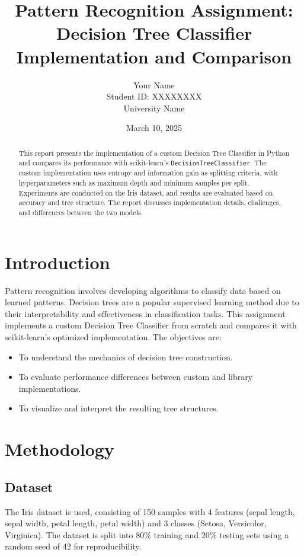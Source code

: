 \documentclass[a4paper,12pt]{article}
\title{Pattern Recognition Assignment: Decision Tree Classifier Implementation and Comparison}
\author{Your Name \\ Student ID: XXXXXXXX \\ University Name}
\date{March 10, 2025}
\begin{document}
\maketitle

\begin{abstract}
This report presents the implementation of a custom Decision Tree Classifier in Python and compares its performance with scikit-learn's \texttt{DecisionTreeClassifier}. The custom implementation uses entropy and information gain as splitting criteria, with hyperparameters such as maximum depth and minimum samples per split. Experiments are conducted on the Iris dataset, and results are evaluated based on accuracy and tree structure. The report discusses implementation details, challenges, and differences between the two models.
\end{abstract}

\tableofcontents
\newpage

\section{Introduction}
Pattern recognition involves developing algorithms to classify data based on learned patterns. Decision trees are a popular supervised learning method due to their interpretability and effectiveness in classification tasks. This assignment implements a custom Decision Tree Classifier from scratch and compares it with scikit-learn’s optimized implementation. The objectives are:
\begin{itemize}
    \item To understand the mechanics of decision tree construction.
    \item To evaluate performance differences between custom and library implementations.
    \item To visualize and interpret the resulting tree structures.
\end{itemize}

\section{Methodology}

\subsection{Dataset}
The Iris dataset \cite{fisher1936iris} is used, consisting of 150 samples with 4 features (sepal length, sepal width, petal length, petal width) and 3 classes (Setosa, Versicolor, Virginica). The dataset is split into 80\% training and 20\% testing sets using a random seed of 42 for reproducibility.
\end{document}
